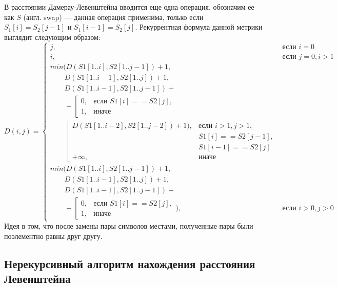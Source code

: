 В расстоянии Дамерау-Левенштейна вводится еще одна операция, обозначим ее как $S$ (англ. swap) --- данная операция применима, только  если $S_{1}[i] = S_{2}[j - 1]$
и $S_{1}[i - 1] = S_{2}[j]$. Рекуррентная формула  данной метрики выглядит следующим образом:
\begin{equation}
	\label{eq:damerau}
	D(i,j) = \left\{ \begin{array}{ll}
		j, & \textrm{$\mbox{если }i = 0$}\\
		i, & \textrm{$\mbox{если }j = 0, i > 1$}\\ 
		min(D(S1[1..i], S2[1.. j - 1]) + 1,\\
		\qquad D(S1[1..i - 1], S2[1..j]) + 1,\\
		\qquad D(S1[1..i - 1], S2[1..j - 1]) + \\
		\qquad+\left[ 
		\begin{array}{ccc}
			0, & \textrm{$\mbox{если }S1[i] == S2[j],$}\\
			1, & \textrm{иначе}
		\end{array} 
		\right.\\
		\qquad \left[
		\begin{array}{ccc}
			D(S1[1..i - 2], S2[1..j - 2]) + 1), & \textrm{$\mbox{если }i > 1, j > 1,$}\\
			& \textrm{$S1[i] == S2[j - 1],$}\\
			& \textrm{$S1[i - 1] == S2[j]$}\\
			+{\infty}, & \textrm{иначе}
		\end{array}
	\right.\\
		
		min(D(S1[1..i], S2[1..j - 1]) + 1,\\
		\qquad D(S1[1..i - 1], S2[1..j]) + 1, \\
		\qquad D(S1[1..i - 1], S2[1..j - 1]) + \\
		\qquad+\left[ 
		\begin{array}{ccc}
			0, & \textrm{$\mbox{если }S1[i] == S2[j],$}\\
			1, & \textrm{иначе}
		\end{array} 
		\right.), &\textrm{$\mbox{если }i>0, j>0$}
	\end{array} \right.
\end{equation}
Идея в том, что после замены пары символов местами, полученные пары были поэлементно равны друг другу.



\subsection{Нерекурсивный алгоритм нахождения расстояния Левенштейна}

